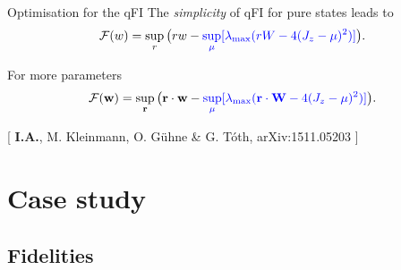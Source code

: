 \documentclass{beamer}
\newcommand{\citate}[1]{{\footnotesize{\color{gray}[ #1 ]}}

	}
\begin{document}
		\begin{frame}
			\begin{block}
				{Optimisation for the qFI}
				\vspace{4px}
				\hspace{10px}The \emph{\color{blue} simplicity} of qFI for pure states leads to
				{\small
				\[
				\mathcal{F}(w) = \sup_{r} \big( r w - {\color{blue}\sup_{\mu} [ \lambda_{\max} ( r W - 4(J_z-{\color{blue}\mu})^2 ) ]} \big).
				\]}

				\hspace{10px}For more parameters
				{\small
				\[
				\mathcal{F}(\mathbf{w}) = \sup_{\mathbf{r}} \big( \mathbf{r}\cdot \mathbf{w} - {\color{blue}\sup_{\mu} [ \lambda_{\max} ( \mathbf{r}\cdot \mathbf{W} - 4(J_z-{\color{blue}\mu})^2 ) ]} \big).
				\]}
				\vspace{-4px}
			\end{block}

			\citate{\textbf{I.A.}, M. Kleinmann, O. G\"uhne \& G. T\'oth, arXiv:1511.05203}

		\end{frame}

\section{Case study}

		\begin{frame}
			\tableofcontents[currentsection]

		\end{frame}

	\subsection{Fidelities}
\end{document}
